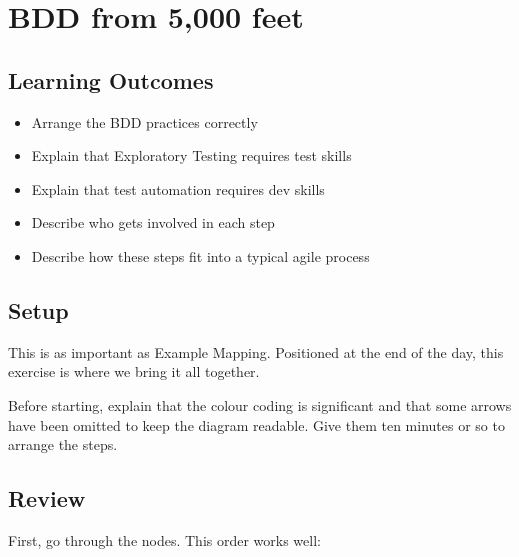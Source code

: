 \chapter*{BDD from 5,000 feet}

\ifnotes

    \section*{Learning Outcomes}
    
    \begin{itemize}
        \item Arrange the BDD practices correctly
        \item Explain that Exploratory Testing requires test skills
        \item Explain that test automation requires dev skills
        \item Describe who gets involved in each step
        \item Describe how these steps fit into a typical agile process
    \end{itemize}

    \section*{Setup}
    
    This is as important as Example Mapping. Positioned at the end of the day, this exercise is where we bring it all together.
    
    Before starting, explain that the colour coding is significant and that some arrows have been omitted to keep the diagram readable. Give them ten minutes or so to arrange the steps.
    
    \section*{Review}
    
    First, go through the nodes. This order works well:
    

